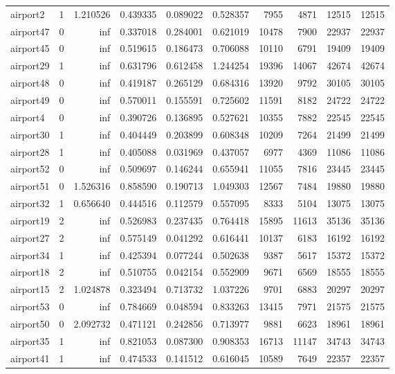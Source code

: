 \begin{longtable}{|l|r|r|r|r|r|r|r|r|r|}
airport2 & 1 & 1.210526 & 0.439335 & 0.089022 & 0.528357 & 7955 & 4871 & 12515 & 12515 \\
airport47 & 0 & inf & 0.337018 & 0.284001 & 0.621019 & 10478 & 7900 & 22937 & 22937 \\
airport45 & 0 & inf & 0.519615 & 0.186473 & 0.706088 & 10110 & 6791 & 19409 & 19409 \\
airport29 & 1 & inf & 0.631796 & 0.612458 & 1.244254 & 19396 & 14067 & 42674 & 42674 \\
airport48 & 0 & inf & 0.419187 & 0.265129 & 0.684316 & 13920 & 9792 & 30105 & 30105 \\
airport49 & 0 & inf & 0.570011 & 0.155591 & 0.725602 & 11591 & 8182 & 24722 & 24722 \\
airport4 & 0 & inf & 0.390726 & 0.136895 & 0.527621 & 10355 & 7882 & 22545 & 22545 \\
airport30 & 1 & inf & 0.404449 & 0.203899 & 0.608348 & 10209 & 7264 & 21499 & 21499 \\
airport28 & 1 & inf & 0.405088 & 0.031969 & 0.437057 & 6977 & 4369 & 11086 & 11086 \\
airport52 & 0 & inf & 0.509697 & 0.146244 & 0.655941 & 11055 & 7816 & 23445 & 23445 \\
airport51 & 0 & 1.526316 & 0.858590 & 0.190713 & 1.049303 & 12567 & 7484 & 19880 & 19880 \\
airport32 & 1 & 0.656640 & 0.444516 & 0.112579 & 0.557095 & 8333 & 5104 & 13075 & 13075 \\
airport19 & 2 & inf & 0.526983 & 0.237435 & 0.764418 & 15895 & 11613 & 35136 & 35136 \\
airport27 & 2 & inf & 0.575149 & 0.041292 & 0.616441 & 10137 & 6183 & 16192 & 16192 \\
airport34 & 1 & inf & 0.425394 & 0.077244 & 0.502638 & 9387 & 5617 & 15372 & 15372 \\
airport18 & 2 & inf & 0.510755 & 0.042154 & 0.552909 & 9671 & 6569 & 18555 & 18555 \\
airport15 & 2 & 1.024878 & 0.323494 & 0.713732 & 1.037226 & 9701 & 6883 & 20297 & 20297 \\
airport53 & 0 & inf & 0.784669 & 0.048594 & 0.833263 & 13415 & 7971 & 21575 & 21575 \\
airport50 & 0 & 2.092732 & 0.471121 & 0.242856 & 0.713977 & 9881 & 6623 & 18961 & 18961 \\
airport35 & 1 & inf & 0.821053 & 0.087300 & 0.908353 & 16713 & 11147 & 34743 & 34743 \\
airport41 & 1 & inf & 0.474533 & 0.141512 & 0.616045 & 10589 & 7649 & 22357 & 22357 \\

\end{longtable}
